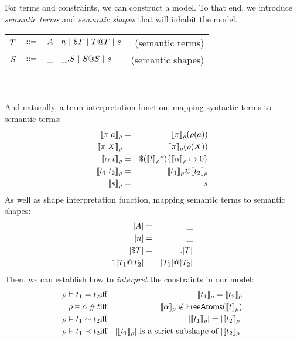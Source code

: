 \documentclass[english, mgr]{iithesis}
\renewcommand{\it}[1]{\textit{#1}}
\begin{document}
For terms and constraints, we can construct a model.
To that end, we introduce \it{semantic terms} and \it{semantic shapes} that will inhabit the model.

\begin{tabular}{rclr}
$T$ & $::=$ & $A
               \ |\  n
               \ |\  \$ T
               \ |\  T @ T
               \ |\  s$
    & (semantic terms) \\
$S$   & $::=$ & $\_
               \ |\  \_. S
               \ |\  S @ S
               \ |\  s$
    & (semantic shapes)
\end{tabular}
\\ \\
And naturally, a term interpretation function, mapping syntactic terms to semantic terms:
\begin{eqnarray*}
  \llbracket \pi \; a \rrbracket_{\rho} & = &
    \llbracket \pi \rrbracket_{\rho}(\rho(a)) \\
  \llbracket \pi \; X \rrbracket_{\rho} & = &
    \llbracket \pi \rrbracket_{\rho}(\rho(X)) \\
  \llbracket \alpha. t \rrbracket_{\rho} & = &
    \$ (\llbracket t \rrbracket_{\rho} \kern-3pt \uparrow)
      \{\llbracket \alpha \rrbracket_{\rho}\mapsto0\} \\
  \llbracket t_1 \; t_2 \rrbracket_{\rho} & = &
    \llbracket t_1 \rrbracket_{\rho} @ \llbracket t_2 \rrbracket_{\rho} \\
  \llbracket s \rrbracket_{\rho} & = & s
\end{eqnarray*}
As well as shape interpretation function, mapping semantic terms to semantic shapes:
\begin{eqnarray*}
  |A|                     & = & \_ \\
  |n|                            & = & \_ \\
  |\$ T|             & = & \_. |T| \\1
  |T_1 @ T_2| & = &
    |T_1| @ |T_2|
\end{eqnarray*}
Then, we can establish how to \it{interpret} the constraints in our model:
\begin{eqnarray*}
  \rho \vDash t_1 = t_2 & \textrm{iff} &
    \llbracket t_1 \rrbracket_{\rho} = \llbracket t_2 \rrbracket_{\rho} \\
  \rho \vDash \alpha \,\#\, t & \textrm{iff} &
    \llbracket \alpha \rrbracket_{\rho} \notin
      \mathsf{FreeAtoms}(\llbracket t \rrbracket_{\rho}) \\
  \rho \vDash t_1 \sim t_2 & \textrm{iff} &
    |\llbracket t_1 \rrbracket_{\rho}| = |\llbracket t_2 \rrbracket_{\rho}| \\
  \rho \vDash t_1 \prec t_2 & \textrm{iff} &
    |\llbracket t_1 \rrbracket_{\rho}| \textrm{ is a strict subshape of }
      |\llbracket t_2 \rrbracket_{\rho}|
\end{eqnarray*}
\end{document}
